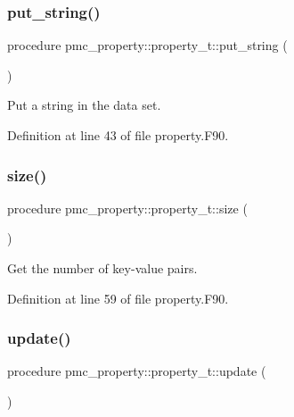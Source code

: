 \subsubsection{\texorpdfstring{put\+\_\+string()}{put\_string()}}
{\footnotesize\ttfamily procedure pmc\+\_\+property\+::property\+\_\+t\+::put\+\_\+string (\begin{DoxyParamCaption}{ }\end{DoxyParamCaption})\hspace{0.3cm}{\ttfamily [private]}}



Put a string in the data set. 



Definition at line 43 of file property.\+F90.

\mbox{\label{structpmc__property_1_1property__t_af1dd17e5913da8175515a6a125767418}} 
\subsubsection{\texorpdfstring{size()}{size()}}
{\footnotesize\ttfamily procedure pmc\+\_\+property\+::property\+\_\+t\+::size (\begin{DoxyParamCaption}{ }\end{DoxyParamCaption})\hspace{0.3cm}{\ttfamily [private]}}



Get the number of key-\/value pairs. 



Definition at line 59 of file property.\+F90.

\mbox{\label{structpmc__property_1_1property__t_a12d75664ff2c58cb563122b0bbd09446}} 
\subsubsection{\texorpdfstring{update()}{update()}}
{\footnotesize\ttfamily procedure pmc\+\_\+property\+::property\+\_\+t\+::update (\begin{DoxyParamCaption}{ }\end{DoxyParamCaption})\hspace{0.3cm}{\ttfamily [private]}}



